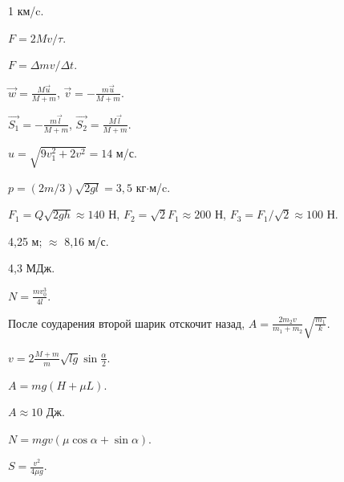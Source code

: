 \begin{Answer}{64}
1 км/c.
\end{Answer}
\begin{Answer}{65}
$F = 2Mv/\tau$.
\end{Answer}
\begin{Answer}{66}
$F = \Delta m v/ \Delta t$.
\end{Answer}
\begin{Answer}{67}
$\vec{w} = \frac{M\vec{u}}{M+m}$, $\vec{v} = -\frac{m\vec{u}}{M+m}$.
\end{Answer}
\begin{Answer}{68}
$\vec{S_1} = -\frac{m\vec{l}}{M+m}$, $\vec{S_2} = \frac{M\vec{l}}{M+m}$.
\end{Answer}
\begin{Answer}{69}
$u = \sqrt{9v_{1}^2 + 2v^2} = 14$ м/с.
\end{Answer}
\begin{Answer}{70}
$p = (2m/3)\sqrt{2gl} = 3,5$ кг$\cdot$м/c.
\end{Answer}
\begin{Answer}{71}
$F_1 = Q\sqrt{2gh} \approx 140$ Н, $F_2 = \sqrt{2} F_1 \approx 200$ Н, $F_3 = F_1/\sqrt{2} \approx 100$ Н.
\end{Answer}
\begin{Answer}{72}
4,25 м; $\approx$ 8,16 м/с.
\end{Answer}
\begin{Answer}{73}
4,3 МДж.
\end{Answer}
\begin{Answer}{74}
$N =\frac{mv_{0}^3}{4l}$.
\end{Answer}
\begin{Answer}{75}
После соударения второй шарик отскочит назад, $A = \frac{2m_2v}{m_1+m_2}\sqrt{\frac{m_1}{k}}$.
\end{Answer}
\begin{Answer}{76}
$v = 2\frac{M+m}{m}\sqrt{lg}\sin \frac{\alpha}{2}$.
\end{Answer}
\begin{Answer}{77}
$A=mg(H+\mu L)$.
\end{Answer}
\begin{Answer}{78}
$A \approx 10$ Дж.
\end{Answer}
\begin{Answer}{79}
$N = mgv(\mu \cos \alpha +\sin \alpha)$.
\end{Answer}
\begin{Answer}{80}
$S = \frac{v^2}{4 \mu g}$.
\end{Answer}
